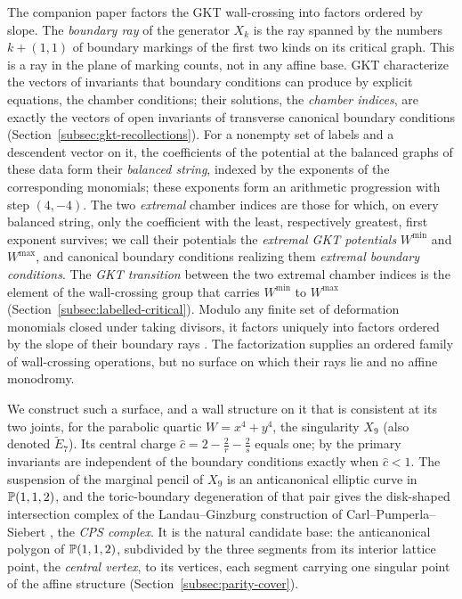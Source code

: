 The companion paper \cite{wuebben2026boundary} factors the GKT
wall-crossing into factors ordered by slope.
The \emph{boundary ray} of the generator $X_k$ is the ray spanned by the
numbers $k+(1,1)$ of boundary markings of the first two kinds on its
critical graph.  This is a ray in the plane of marking counts, not in any affine
base.  GKT characterize the vectors of invariants that boundary conditions
can produce by explicit equations, the chamber conditions; their solutions,
the \emph{chamber indices}, are exactly the vectors of open invariants of
transverse canonical boundary conditions
(Section~\ref{subsec:gkt-recollections}).  For a nonempty set of labels and
a descendent vector on it, the coefficients of the potential at the balanced
graphs of these data form their \emph{balanced string}, indexed by the
exponents of the corresponding monomials; these exponents form an arithmetic
progression with step $(4,-4)$.  The two \emph{extremal} chamber indices are those for
which, on every balanced string, only the coefficient with the least,
respectively greatest, first exponent survives; we call their potentials
the \emph{extremal GKT potentials} $W^{\min}$ and $W^{\max}$, and canonical
boundary conditions realizing them \emph{extremal boundary conditions}.
The \emph{GKT transition} between the two extremal chamber indices is the
element of the wall-crossing group that carries $W^{\min}$ to $W^{\max}$
(Section~\ref{subsec:labelled-critical}).  Modulo any finite set of
deformation monomials closed under taking divisors, it factors uniquely into
factors ordered by the slope of their boundary rays
\cite[Thm.~1.1 and Prop.~3.1]{wuebben2026boundary}.  The factorization supplies
an ordered family of wall-crossing operations, but no surface on which their
rays lie and no affine monodromy.

We construct such a surface, and a wall structure on it that is consistent at
its two joints, for the
parabolic quartic $W=x^4+y^4$, the singularity $X_9$ (also denoted
$\widetilde E_7$).  Its central charge
$\widehat c=2-\frac2r-\frac2s$ equals one; by \cite{wuebben2026threshold} the
primary invariants are independent of the boundary conditions exactly when
$\widehat c<1$.  The suspension of the marginal pencil of $X_9$ is an
anticanonical elliptic curve in $\mathbb P(1,1,2)$, and the toric-boundary
degeneration of that pair gives the disk-shaped intersection complex of the
Landau--Ginzburg construction of Carl--Pumperla--Siebert \cite{carletal2024},
the \emph{CPS complex}.  It is the natural candidate base: the
anticanonical polygon of $\mathbb P(1,1,2)$, subdivided by the three segments from
its interior lattice point, the \emph{central vertex}, to its vertices, each
segment carrying one singular point of the affine structure
(Section~\ref{subsec:parity-cover}).

